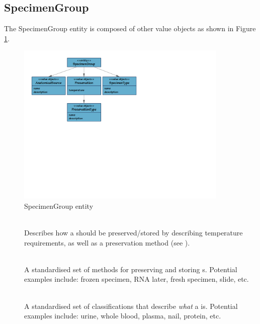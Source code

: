 \subsection{SpecimenGroup}
\label{sec:specimen-group}

The SpecimenGroup entity is composed of other value objects as shown in Figure
\ref{fig:specimen-group}.

\begin{figure}[h]
  \centering
  \includegraphics[trim={9mm 110mm 80mm 9mm}, clip,
    width=0.9\textwidth]{images/specimen-group}
  \caption{SpecimenGroup entity}
  \label{fig:specimen-group}
\end{figure}

\begin{description}

  \item[] \hfill \\ Describes how a
     should be preserved/stored by describing temperature
    requirements, as well as a preservation method (see
    ).

  \item[] \hfill \\ A standardised set of
    methods for preserving and storing s.  Potential
    examples include: frozen specimen, RNA later, fresh specimen, slide, etc.

  \item[] \hfill \\ A standardised set of
    classifications that describe \emph{what} a 
    is. Potential examples include: urine, whole blood, plasma, nail, protein,
    etc.

\end{description}

